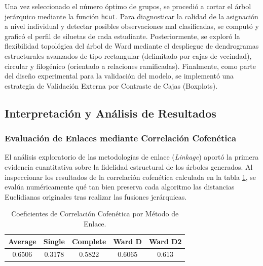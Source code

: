 \documentclass[
  10pt,
  a4paper]{article}
\begin{document}
Una vez seleccionado el número óptimo de grupos, se procedió a cortar el árbol jerárquico mediante la función \texttt{hcut}. Para diagnosticar la calidad de la asignación a nivel individual y detectar posibles observaciones mal clasificadas, se computó y graficó el perfil de siluetas de cada estudiante. Posteriormente, se exploró la flexibilidad topológica del árbol de Ward mediante el despliegue de dendrogramas estructurales avanzados de tipo rectangular (delimitado por cajas de vecindad), circular y filogénico (orientado a relaciones ramificadas). Finalmente, como parte del diseño experimental para la validación del modelo, se implementó una estrategia de Validación Externa por Contraste de Cajas (Boxplots).

\subsection{Interpretación y Análisis de Resultados}\label{interpretaciuxf3n-y-anuxe1lisis-de-resultados}

\subsubsection{Evaluación de Enlaces mediante Correlación Cofenética}\label{evaluaciuxf3n-de-enlaces-mediante-correlaciuxf3n-cofenuxe9tica}

El análisis exploratorio de las metodologías de enlace (\emph{Linkage}) aportó la primera evidencia cuantitativa sobre la fidelidad estructural de los árboles generados. Al inspeccionar los resultados de la correlación cofenética calculada en la tabla \ref{tab:correlacioncofenetica}, se evalúa numéricamente qué tan bien preserva cada algoritmo las distancias Euclidianas originales tras realizar las fusiones jerárquicas.

\vspace{0.3cm}

\begin{table}[!h]
\centering
\caption{\label{tab:correlacioncofenetica}Coeficientes de Correlación Cofenética por Método de Enlace.}
\centering
\begin{tabular}[t]{ccccc}
\toprule
\textbf{Average} & \textbf{Single} & \textbf{Complete} & \textbf{Ward D} & \textbf{Ward D2}\\
\midrule
0.6506 & 0.3178 & 0.5822 & 0.6065 & 0.613\\
\bottomrule
\end{tabular}
\end{table}
\end{document}
